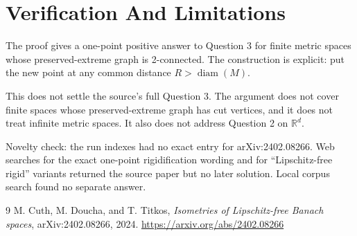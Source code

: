 \documentclass[11pt]{article}
\newcommand{\diam}{\operatorname{diam}}
\begin{document}
\section*{Verification And Limitations}

The proof gives a one-point positive answer to Question 3 for finite metric spaces whose preserved-extreme graph is 2-connected.  The construction is explicit: put the new point at any common distance \(R>\diam(M)\).

This does not settle the source's full Question 3.  The argument does not cover finite spaces whose preserved-extreme graph has cut vertices, and it does not treat infinite metric spaces.  It also does not address Question 2 on \(\mathbb R^d\).

Novelty check: the run indexes had no exact entry for arXiv:2402.08266.  Web searches for the exact one-point rigidification wording and for ``Lipschitz-free rigid'' variants returned the source paper but no later solution.  Local corpus search found no separate answer.

\begin{thebibliography}{9}
M. Cuth, M. Doucha, and T. Titkos,
\emph{Isometries of Lipschitz-free Banach spaces},
arXiv:2402.08266, 2024.
\url{https://arxiv.org/abs/2402.08266}
\end{thebibliography}
\end{document}

